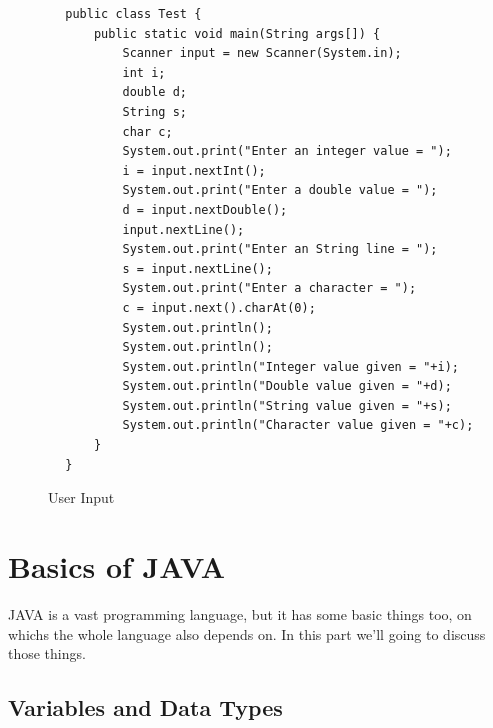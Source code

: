 \documentclass[openany]{book}  %
\begin{document}
\begin{flushleft}
\begin{center}
\begin{verbatim}
        public class Test {
            public static void main(String args[]) {
                Scanner input = new Scanner(System.in);
                int i;
                double d;
                String s;
                char c;
                System.out.print("Enter an integer value = ");
                i = input.nextInt();
                System.out.print("Enter a double value = ");
                d = input.nextDouble();
                input.nextLine();
                System.out.print("Enter an String line = ");
                s = input.nextLine();
                System.out.print("Enter a character = ");
                c = input.next().charAt(0);
                System.out.println();
                System.out.println();
                System.out.println("Integer value given = "+i);
                System.out.println("Double value given = "+d);
                System.out.println("String value given = "+s);
                System.out.println("Character value given = "+c);
            }
        }
    \end{verbatim}
    \end{center}
    \begin{figure}[htbp]
        \begin{center}
            \caption{User Input\cite{Ref7}\cite{Ref3}}
        \end{center}
    \end{figure}

    \part{Basics of JAVA}
    JAVA is a vast programming language, but it has some basic things too, on
    whichs the whole language also depends on. In this part we'll going to discuss those things.
    \chapter{Variables and Data Types}

\end{flushleft}
\end{document}
